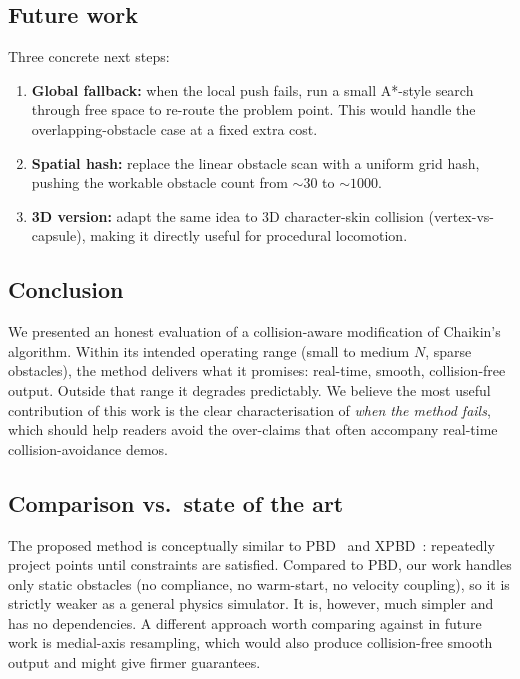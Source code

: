 \documentclass[10pt,a4paper,twocolumn]{article}
\begin{document}
\subsection{Future work}
Three concrete next steps:
\begin{enumerate}
  \item \textbf{Global fallback:} when the local push fails, run a
        small A*-style search through free space to re-route the
        problem point. This would handle the overlapping-obstacle
        case at a fixed extra cost.
  \item \textbf{Spatial hash:} replace the linear obstacle scan with
        a uniform grid hash, pushing the workable obstacle count from
        $\sim 30$ to $\sim 1000$.
  \item \textbf{3D version:} adapt the same idea to 3D character-skin
        collision (vertex-vs-capsule), making it directly useful for
        procedural locomotion.
\end{enumerate}

\subsection{Conclusion}
We presented an honest evaluation of a collision-aware modification of
Chaikin's algorithm. Within its intended operating range (small to
medium $N$, sparse obstacles), the method delivers what it promises:
real-time, smooth, collision-free output. Outside that range it
degrades predictably. We believe the most useful contribution of this
work is the clear characterisation of \emph{when the method fails},
which should help readers avoid the over-claims that often accompany
real-time collision-avoidance demos.

\subsection*{Comparison vs.\ state of the art}
The proposed method is conceptually similar to PBD~\cite{muller2007}
and XPBD~\cite{macklin2016}: repeatedly project points until
constraints are satisfied. Compared to PBD, our work handles only
static obstacles (no compliance, no warm-start, no velocity
coupling), so it is strictly weaker as a general physics simulator. It
is, however, much simpler and has no dependencies. A different
approach worth comparing against in future work is medial-axis
resampling, which would also produce collision-free smooth output and
might give firmer guarantees.
\end{document}

